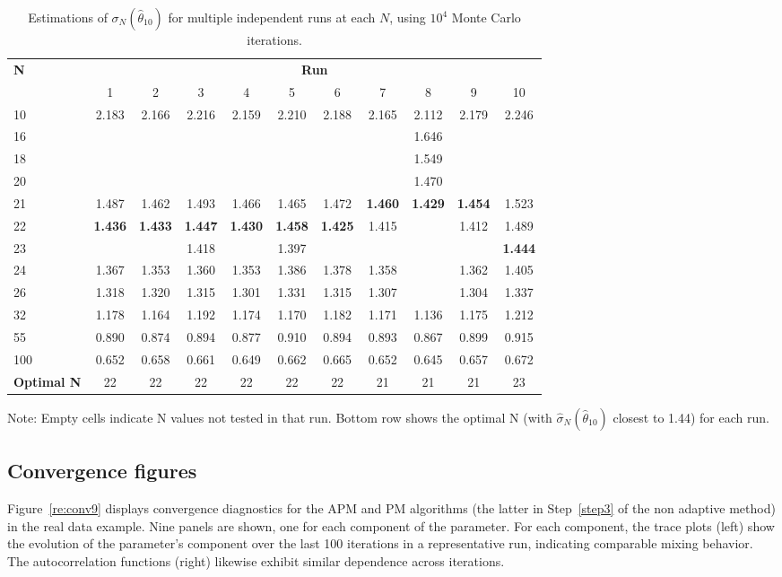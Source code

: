\documentclass[pdflatex,sn-mathphys-num]{sn-jnl}
\theoremstyle{thmstyleone}
\theoremstyle{thmstyletwo}
\theoremstyle{thmstylethree}
\begin{document}
\begin{table}[h]
\centering
\caption{Estimations of $\sigma_N(\hat \theta_{10})$ for multiple independent runs at each $N$, using $10^{4}$ Monte Carlo iterations.}
\label{re:step2}
\begin{tabular}{@{}l*{10}{c}@{}}
\toprule
\textbf{N} & \multicolumn{10}{c}{\textbf{Run}} \\
\cmidrule(lr){2-11}
 & 1 & 2 & 3 & 4 & 5 & 6 & 7 & 8 & 9 & 10 \\
\hline
10 & 2.183 & 2.166 & 2.216 & 2.159 & 2.210 & 2.188 & 2.165 & 2.112 & 2.179 & 2.246 \\
16 & & & & & & & & 1.646 & & \\
18 & & & & & & & & 1.549 & & \\
20 & & & & & & & & 1.470 & & \\
21 & 1.487 & 1.462 & 1.493 & 1.466 & 1.465 & 1.472 & \textbf{1.460} & \textbf{1.429} & \textbf{1.454} & 1.523 \\
22 & \textbf{1.436} & \textbf{1.433} & \textbf{1.447} & \textbf{1.430} & \textbf{1.458} & \textbf{1.425} & 1.415 & & 1.412 & 1.489 \\
23 & & & 1.418 & & 1.397 & & & & & \textbf{1.444} \\
24 & 1.367 & 1.353 & 1.360 & 1.353 & 1.386 & 1.378 & 1.358 & & 1.362 & 1.405 \\
26 & 1.318 & 1.320 & 1.315 & 1.301 & 1.331 & 1.315 & 1.307 & & 1.304 & 1.337 \\
32 & 1.178 & 1.164 & 1.192 & 1.174 & 1.170 & 1.182 & 1.171 & 1.136 & 1.175 & 1.212 \\
55 & 0.890 & 0.874 & 0.894 & 0.877 & 0.910 & 0.894 & 0.893 & 0.867 & 0.899 & 0.915 \\
100 & 0.652 & 0.658 & 0.661 & 0.649 & 0.662 & 0.665 & 0.652 & 0.645 & 0.657 & 0.672 \\
\hline
\textbf{Optimal N} & 22 & 22 & 22 & 22 & 22 & 22 & 21 & 21 & 21 & 23 \\
\bottomrule
\end{tabular}
\vspace{0.2cm}
\footnotesize Note: Empty cells indicate N values not tested in that run. Bottom row shows the optimal N (with $\hat\sigma_{N}(\hat\theta_{10})$ closest to 1.44) for each run. 
\end{table}

\subsection{Convergence figures}
\label{appendixE4}
Figure~\ref{re:conv9} displays convergence diagnostics for the APM and PM algorithms (the latter in Step~\ref{step3} of the non adaptive method) in the real data example. Nine panels are shown, one for each component of the parameter. For each component, the trace plots (left) show the evolution of the parameter's component over the last 100 iterations in a representative run, indicating comparable mixing behavior. The autocorrelation functions (right) likewise exhibit similar dependence across iterations.
\end{document}
